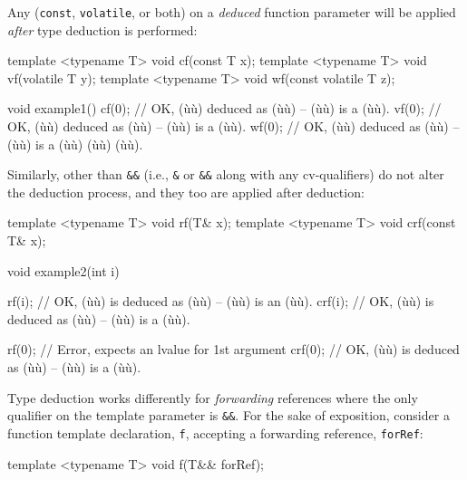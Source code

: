\noindent Any  (\lstinline!const!, \lstinline!volatile!, or both)
on a \emph{deduced} function parameter will be applied \emph{after} type
deduction is performed:

\begin{emcppslisting}
template <typename T> void cf(const T x);
template <typename T> void vf(volatile T y);
template <typename T> void wf(const volatile T z);

void example1()
{
    cf(0);  // OK, (ù{}ù) deduced as (ù{}ù) -- (ù{}ù) is a (ù{}ù).
    vf(0);  // OK, (ù{}ù) deduced as (ù{}ù) -- (ù{}ù) is a (ù{}ù).
    wf(0);  // OK, (ù{}ù) deduced as (ù{}ù) -- (ù{}ù) is a (ù{}ù) (ù{}ù) (ù{}ù).
}
\end{emcppslisting}

\noindent Similarly,  other than \lstinline!&&!
(i.e., \lstinline!&! or \lstinline!&&! along with any cv-qualifiers) do not
alter the deduction process, and they too are applied after deduction:

\begin{emcppslisting}
template <typename T> void rf(T& x);
template <typename T> void crf(const T& x);

void example2(int i)
{
    rf(i);   // OK, (ù{}ù) is deduced as (ù{}ù) -- (ù{}ù) is an (ù{}ù).
    crf(i);  // OK, (ù{}ù) is deduced as (ù{}ù) -- (ù{}ù) is a (ù{}ù).

    rf(0);   // Error, expects an lvalue for 1st argument
    crf(0);  // OK, (ù{}ù) is deduced as (ù{}ù) -- (ù{}ù) is a (ù{}ù).
}
\end{emcppslisting}

\noindent Type deduction works differently for \emph{forwarding} references
where the only qualifier on the template parameter is \lstinline!&&!. For
the sake of exposition, consider a function template declaration,
\lstinline!f!, accepting a forwarding reference, \lstinline!forRef!:

\begin{emcppslisting}[emcppsbatch=e3]
template <typename T> void f(T&& forRef);
\end{emcppslisting}

